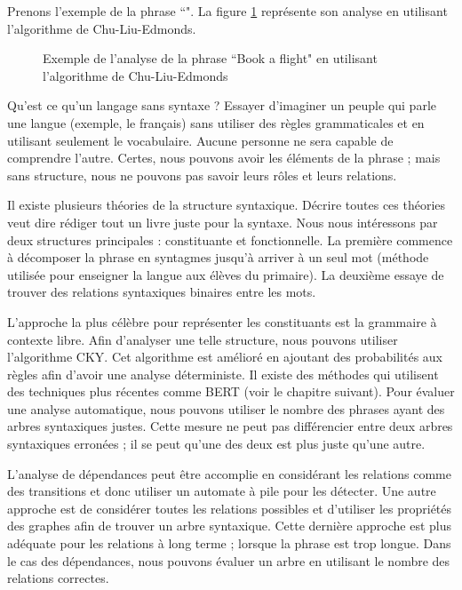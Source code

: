 \documentclass{KodeBook}
\begin{document}
Prenons l'exemple de la phrase ``".
La figure \ref{fig:cke-exp} représente son analyse en utilisant l'algorithme de Chu-Liu-Edmonds. 

\begin{figure}[ht]
	\centering
	\caption[Exemple de l'analyse Chu-Liu-Edmonds]{Exemple de l'analyse de la phrase ``Book a flight" en utilisant l'algorithme de Chu-Liu-Edmonds \cite{2019-jurafsky-martin}\label{fig:cke-exp}}
\end{figure}


\begin{discussion}
Qu'est ce qu'un langage sans syntaxe ?
Essayer d'imaginer un peuple qui parle une langue (exemple, le français) sans utiliser des règles grammaticales et en utilisant seulement le vocabulaire. 
Aucune personne ne sera capable de comprendre l'autre. 
Certes, nous pouvons avoir les éléments de la phrase ; mais sans structure, nous ne pouvons pas savoir leurs rôles et leurs relations. 

Il existe plusieurs théories de la structure syntaxique. 
Décrire toutes ces théories veut dire rédiger tout un livre juste pour la syntaxe. 
Nous nous intéressons par deux structures principales : constituante et fonctionnelle.
La première commence à décomposer la phrase en syntagmes jusqu'à arriver à un seul mot (méthode utilisée pour enseigner la langue aux élèves du primaire). 
La deuxième essaye de trouver des relations syntaxiques binaires entre les mots.

L'approche la plus célèbre pour représenter les constituants est la grammaire à contexte libre. 
Afin d'analyser une telle structure, nous pouvons utiliser l'algorithme CKY. 
Cet algorithme est amélioré en ajoutant des probabilités aux règles afin d'avoir une analyse déterministe. 
Il existe des méthodes qui utilisent des techniques plus récentes comme BERT (voir le chapitre suivant). 
Pour évaluer une analyse automatique, nous pouvons utiliser le nombre des phrases ayant des arbres syntaxiques justes. 
Cette mesure ne peut pas différencier entre deux arbres syntaxiques erronées ; il se peut qu'une des deux est plus juste qu'une autre. 

L'analyse de dépendances peut être accomplie en considérant les relations comme des transitions et donc utiliser un automate à pile pour les détecter.
Une autre approche est de considérer toutes les relations possibles et d'utiliser les propriétés des graphes afin de trouver un arbre syntaxique. 
Cette dernière approche est plus adéquate pour les relations à long terme ; lorsque la phrase est trop longue.
Dans le cas des dépendances, nous pouvons évaluer un arbre en utilisant le nombre des relations correctes.
\end{discussion}

\ifx\wholebook\relax\else
% 
% 
	
\end{document}
